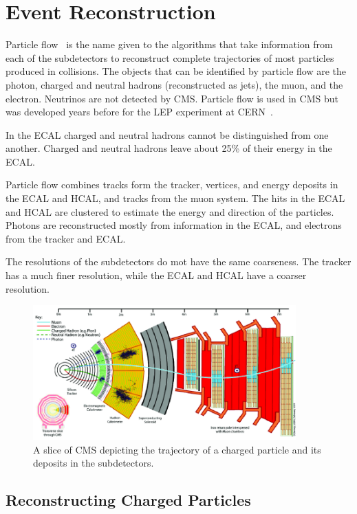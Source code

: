 \chapter{Event Reconstruction}\label{chap:pflow}




Particle flow~\cite{particleflow} is the name given to the algorithms that take information from each of the subdetectors to reconstruct complete trajectories of most particles produced in collisions. The objects that can be identified by particle flow are the photon, charged and neutral hadrons (reconstructed as jets), the muon, and the electron. Neutrinos are not detected by CMS. Particle flow is used in CMS but was developed years before for the LEP experiment at CERN~\cite{particleflow2}.

In the ECAL charged and neutral hadrons cannot be distinguished from one another. Charged and neutral hadrons leave about 25\% of their energy in the ECAL.


Particle flow combines tracks form the tracker, vertices, and energy deposits in the ECAL and HCAL, and tracks from the muon system. The hits in the ECAL and HCAL are clustered to estimate the energy and direction of the particles. Photons are reconstructed mostly from information in the ECAL, and electrons from the tracker and ECAL. 

The resolutions of the subdetectors do mot have the same coarseness. The tracker has a much finer resolution, while the ECAL and HCAL have a coarser resolution.

 \begin{figure}[h]
\centering
\includegraphics[width=0.9\textwidth]{figures/cms_slice}
\caption{A slice of CMS depicting the trajectory of a charged particle and its deposits in the subdetectors.}
\label{fig:cms_slice}
\end{figure}

\section{Reconstructing Charged Particles}


